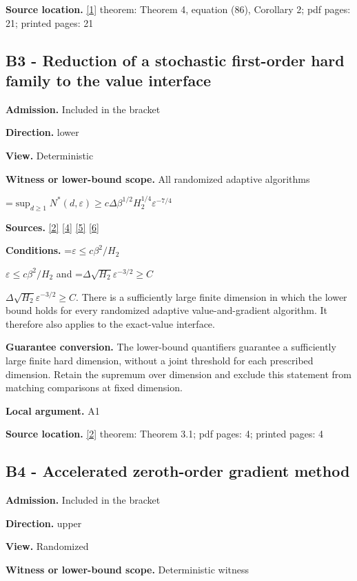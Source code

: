 \documentclass[10pt,a4paper]{article}
\newcommand{\AtlasMath}[1]{\par\begingroup\centering\setbox0=\hbox{$\displaystyle #1$}\ifdim\wd0>1.4\linewidth\typeout{ATLAS WIDE FORMULA: \the\wd0}\fi\ifdim\wd0>\linewidth\resizebox{\linewidth}{!}{\box0}\else\box0\fi\par\endgroup}
\newcommand{\AtlasInlineMath}[1]{\begingroup\setbox0=\hbox{$#1$}\ifdim\wd0>.4\linewidth\endgroup\AtlasMath{#1}\else\endgroup$#1$\fi}
\begin{document}
\textbf{Source location.} \href{https://link.springer.com/article/10.1007/s10915-025-02842-z}{[1]} theorem: Theorem 4, equation (86), Corollary 2; pdf pages: 21; printed pages: 21

\subsection{B3 - Reduction of a stochastic first-order hard family to the value interface}
\textbf{Admission.} Included in the bracket

\textbf{Direction.} lower

\textbf{View.} Deterministic

\textbf{Witness or lower-bound scope.} All randomized adaptive algorithms

\AtlasMath{\sup_{d\ge1}N^*(d,\varepsilon)\ge c\Delta\beta^{1/2}H_2^{1/4}\varepsilon^{-7/4}}
\textbf{Sources.} \href{https://arxiv.org/pdf/2610.00245v2}{[2]} \href{https://arxiv.org/html/2610.19652v1}{[4]} \href{https://arxiv.org/html/2609.00045v3}{[5]} \href{https://arxiv.org/html/2610.17074v1}{[6]}

\textbf{Conditions.} \AtlasInlineMath{\varepsilon\le c\beta^2/H_2} and \AtlasInlineMath{\Delta\sqrt{H_2}\varepsilon^{-3/2}\ge C}. There is a sufficiently large finite dimension in which the lower bound holds for every randomized adaptive value-and-gradient algorithm. It therefore also applies to the exact-value interface.

\textbf{Guarantee conversion.} The lower-bound quantifiers guarantee a sufficiently large finite hard dimension, without a joint threshold for each prescribed dimension. Retain the supremum over dimension and exclude this statement from matching comparisons at fixed dimension.

\textbf{Local argument.} A1

\textbf{Source location.} \href{https://arxiv.org/pdf/2610.00245v2}{[2]} theorem: Theorem 3.1; pdf pages: 4; printed pages: 4

\subsection{B4 - Accelerated zeroth-order gradient method}
\textbf{Admission.} Included in the bracket

\textbf{Direction.} upper

\textbf{View.} Randomized

\textbf{Witness or lower-bound scope.} Deterministic witness
\end{document}
